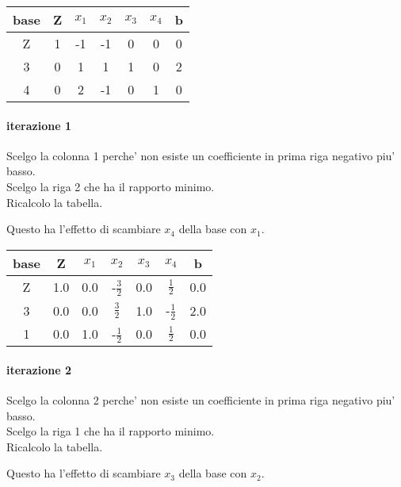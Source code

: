 
\begin{center}
	\begin{tabular}{|c|c|c|c|c|c|c|}
		\hline
		base & Z & $x_1$ & $x_2$ & $x_3$ & $x_4$ & b\\
		\hline
		Z & 1 & -1 & -1 & 0 & 0 & 0\\
		3 & 0 & 1 & 1 & 1 & 0 & 2\\
		4 & 0 & 2 & -1 & 0 & 1 & 0\\
		\hline
	\end{tabular}
\end{center}

\paragraph{iterazione 1}

Scelgo la colonna 1 perche' non esiste un coefficiente in prima riga negativo piu' basso. \\

Scelgo la riga 2 che ha il rapporto minimo. \\

Ricalcolo la tabella.

Questo ha l'effetto di scambiare $x_4$ della base con $x_1$. \

\begin{center}
	\begin{tabular}{|c|c|c|c|c|c|c|}
		\hline
		base & Z & $x_1$ & $x_2$ & $x_3$ & $x_4$ & b\\
		\hline
		Z & 1.0 & 0.0 & -$\frac 3 2$ & 0.0 & $\frac 1 2$ & 0.0\\
		3 & 0.0 & 0.0 & $\frac 3 2$ & 1.0 & -$\frac 1 2$ & 2.0\\
		1 & 0.0 & 1.0 & -$\frac 1 2$ & 0.0 & $\frac 1 2$ & 0.0\\
		\hline
	\end{tabular}
\end{center}

\paragraph{iterazione 2}

Scelgo la colonna 2 perche' non esiste un coefficiente in prima riga negativo piu' basso. \\

Scelgo la riga 1 che ha il rapporto minimo. \\

Ricalcolo la tabella.

Questo ha l'effetto di scambiare $x_3$ della base con $x_2$. \


